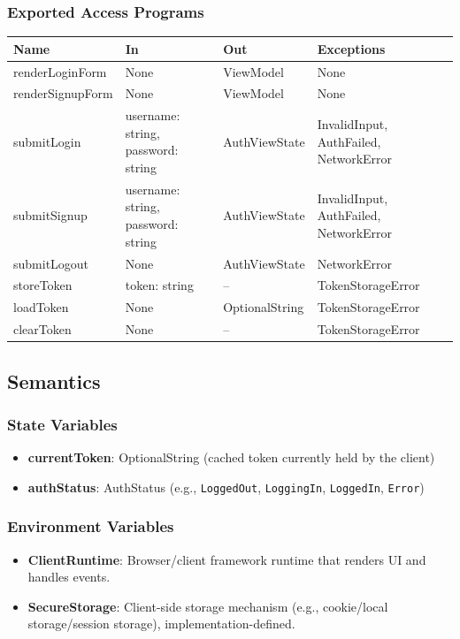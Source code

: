 \documentclass[12pt, titlepage]{article}
\begin{document}
\subsubsection{Exported Access Programs}

\begin{center}
\begin{tabular}{p{4.5cm} p{4.5cm} p{3.5cm} p{3.5cm}}
\toprule
\textbf{Name} & \textbf{In} & \textbf{Out} & \textbf{Exceptions} \\
\midrule
renderLoginForm & None & ViewModel & None \\
renderSignupForm & None & ViewModel & None \\
submitLogin & username: string, password: string & AuthViewState & InvalidInput, AuthFailed, NetworkError \\
submitSignup & username: string, password: string & AuthViewState & InvalidInput, AuthFailed, NetworkError \\
submitLogout & None & AuthViewState & NetworkError \\
storeToken & token: string & -- & TokenStorageError \\
loadToken & None & OptionalString & TokenStorageError \\
clearToken & None & -- & TokenStorageError \\
\bottomrule
\end{tabular}
\end{center}

\subsection{Semantics}

\subsubsection{State Variables}
\begin{itemize}
    \item \textbf{currentToken}: OptionalString \quad (cached token currently held by the client)
    \item \textbf{authStatus}: AuthStatus \quad (e.g., \texttt{LoggedOut}, \texttt{LoggingIn}, \texttt{LoggedIn}, \texttt{Error})
\end{itemize}

\subsubsection{Environment Variables}
\begin{itemize}
    \item \textbf{ClientRuntime}: Browser/client framework runtime that renders UI and handles events.
    \item \textbf{SecureStorage}: Client-side storage mechanism (e.g., cookie/local storage/session storage), implementation-defined.
\end{itemize}
\end{document}
